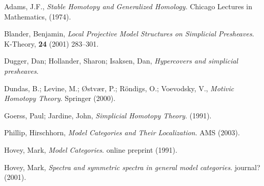\documentclass{amsart}%
\begin{document}
\begin{thebibliography}{OOOO}
     Adams, J.F., {\it Stable Homotopy and
    Generalized Homology.} Chicago Lectures in Mathematics, (1974).


     Blander, Benjamin, {\it Local Projective
    Model Structures on Simplicial Presheaves}. K-Theory, {\bf 24}
  (2001) 283--301.



     Dugger, Dan; Hollander, Sharon; Isaksen, Dan,
  {\it Hypercovers and simplicial presheaves}.

     Dundas, B.; Levine, M.;
  {\O}stv{\ae}r, P.; R\"ondigs, O.; Voevodsky, V., {\it Motivic
    Homotopy Theory}. Springer (2000).





     Goerss, Paul; Jardine, John, {\it Simplicial
    Homotopy Theory}. (1991).

     Phillip, Hirschhorn, {\it Model Categories
    and Their Localization}. AMS (2003).

     Hovey, Mark, {\it Model Categories}.
  online preprint (1991).
  
     Hovey, Mark, {\it Spectra and symmetric
    spectra in general model categories}. journal? (2001).


\end{thebibliography}
\end{document}
